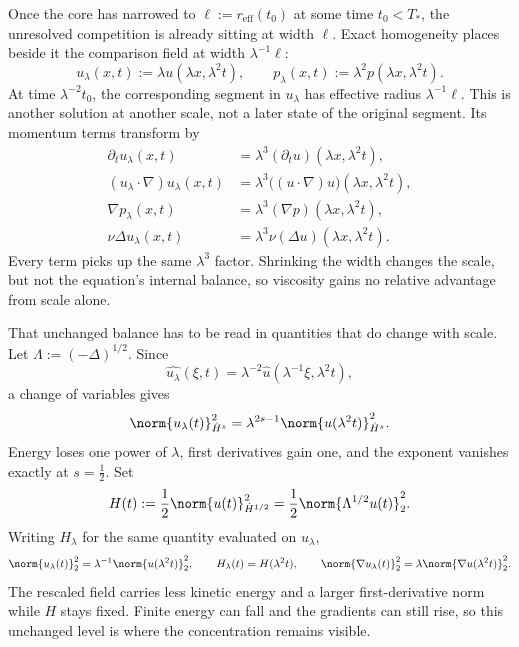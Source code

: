 
Once the core has narrowed to \(\ell:=r_{\mathrm{eff}}(t_0)\) at some time \(t_0<T_*\), the unresolved competition is already sitting at width \(\ell\). Exact \NavierStokes{} homogeneity places beside it the comparison field at width \(\lambda^{-1}\ell\):
\[
  u_\lambda(x,t)
  :=
  \lambda u(\lambda x,\lambda^2t),
  \qquad
  p_\lambda(x,t)
  :=
  \lambda^2p(\lambda x,\lambda^2t).
\]
At time \(\lambda^{-2}t_0\), the corresponding segment in \(u_\lambda\) has effective radius \(\lambda^{-1}\ell\). This is another solution at another scale, not a later state of the original segment. Its momentum terms transform by
\[
\begin{aligned}
  \partial_tu_\lambda(x,t)
  &=
  \lambda^3(\partial_tu)(\lambda x,\lambda^2t),
  \\
  (u_\lambda\cdot\nabla)u_\lambda(x,t)
  &=
  \lambda^3\bigl((u\cdot\nabla)u\bigr)(\lambda x,\lambda^2t),
  \\
  \nabla p_\lambda(x,t)
  &=
  \lambda^3(\nabla p)(\lambda x,\lambda^2t),
  \\
  \nu\Delta u_\lambda(x,t)
  &=
  \lambda^3\nu(\Delta u)(\lambda x,\lambda^2t).
\end{aligned}
\]
Every term picks up the same \(\lambda^3\) factor. Shrinking the width changes the scale, but not the equation's internal balance, so viscosity gains no relative advantage from scale alone.


That unchanged balance has to be read in quantities that do change with scale. Let \(\Lambda:=(-\Delta)^{1/2}\). Since
\[
  \widehat{u_\lambda}(\xi,t)
  =
  \lambda^{-2}\widehat u(\lambda^{-1}\xi,\lambda^2t),
\]
a change of variables gives
\[
  \norm{u_\lambda(t)}_{\dot H^s}^2
  =
  \lambda^{2s-1}
  \norm{u(\lambda^2t)}_{\dot H^s}^2.
\]
Energy loses one power of \(\lambda\), first derivatives gain one, and the exponent vanishes exactly at \(s=\tfrac12\). Set
\[
  H(t)
  :=
  \frac12\norm{u(t)}_{\dot H^{1/2}}^2
  =
  \frac12\norm{\Lambda^{1/2}u(t)}_2^2.
\]
Writing \(H_\lambda\) for the same quantity evaluated on \(u_\lambda\),
\[
  \norm{u_\lambda(t)}_2^2
  =
  \lambda^{-1}\norm{u(\lambda^2t)}_2^2,
  \qquad
  H_\lambda(t)=H(\lambda^2t),
  \qquad
  \norm{\nabla u_\lambda(t)}_2^2
  =
  \lambda\norm{\nabla u(\lambda^2t)}_2^2.
\]
The rescaled field carries less kinetic energy and a larger first-derivative norm while \(H\) stays fixed. Finite energy can fall and the gradients can still rise, so this unchanged level is where the concentration remains visible.

